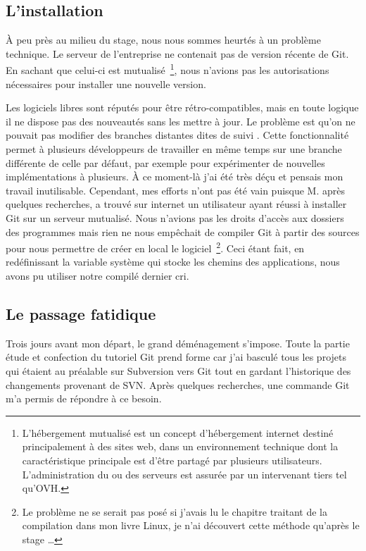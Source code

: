 \subsection{L'installation} %

À peu près au milieu du stage, nous nous sommes heurtés à un problème
technique. Le serveur de l'entreprise ne contenait pas de version récente de
Git. En sachant que celui-ci est mutualisé\, \footnote{L'hébergement mutualisé
est un concept d'hébergement internet destiné principalement à des sites web,
dans un environnement technique dont la caractéristique principale est d'être
partagé par plusieurs utilisateurs. L'administration du ou des serveurs est
assurée par un intervenant tiers tel qu'OVH.}, nous n'avions pas les
autorisations nécessaires pour installer une nouvelle version.

Les logiciels libres sont réputés pour être rétro-compatibles, mais en toute
logique il ne dispose pas des nouveautés sans les mettre à jour. Le problème
est qu'on ne pouvait pas modifier des branches distantes dites \og de suivi
\fg{}. Cette fonctionnalité permet à plusieurs développeurs de travailler en
même temps sur une branche différente de celle par défaut, par exemple pour
expérimenter de nouvelles implémentations à plusieurs. À ce moment-là j'ai été
très déçu et pensais mon travail inutilisable. Cependant, mes efforts n'ont pas
été vain puisque M. après quelques recherches, a trouvé sur
internet un utilisateur ayant réussi à installer Git sur un serveur mutualisé.
Nous n'avions pas les droits d'accès aux dossiers des programmes mais rien ne
nous empêchait de compiler Git à partir des sources pour nous permettre de
créer en local le logiciel\, \footnote{Le problème ne se serait pas posé si
j'avais lu le chapitre traitant de la compilation dans mon livre Linux, je n'ai
découvert cette méthode qu'après le stage \ldots{}}. Ceci étant fait, en
redéfinissant la variable système qui stocke les chemins des applications, nous
avons pu utiliser notre compilé dernier cri.


\subsection{Le passage fatidique} %

Trois jours avant mon départ, le grand déménagement s'impose. Toute la partie
étude et confection du tutoriel Git prend forme car j'ai basculé tous les
projets qui étaient au préalable sur Subversion vers Git tout en gardant
l'historique des changements provenant de SVN. Après quelques recherches, une
commande Git m'a permis de répondre à ce besoin.


